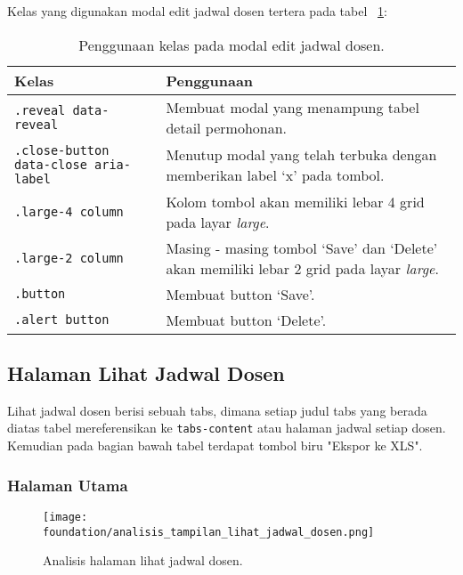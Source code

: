 Kelas yang digunakan modal edit jadwal dosen tertera pada tabel ~\ref{fig:analisisEditEntriJadwalDosen}:
\begin{table}[H]
	\centering
	\caption{Penggunaan kelas pada modal edit jadwal dosen.}
	\begin{tabularx}{\textwidth}{lX}
		\toprule
		Kelas     & Penggunaan \\
		\midrule
		\texttt{.reveal data-reveal} & Membuat modal yang menampung tabel detail permohonan.\\
		\texttt{.close-button data-close aria-label} & Menutup modal yang telah terbuka dengan memberikan label `x' pada tombol.\\
		\texttt{.large-4 column} & Kolom tombol akan memiliki lebar 4 grid pada layar \textit{large}.\\
		\texttt{.large-2 column} & Masing - masing tombol `Save' dan `Delete' akan memiliki lebar 2 grid pada layar \textit{large}.\\
		\texttt{.button} & Membuat button `Save'.\\
		\texttt{.alert button} & Membuat button `Delete'.\\
		\bottomrule
	\end{tabularx}%
	\label{fig:analisisEditEntriJadwalDosen}
\end{table}


\subsection{Halaman Lihat Jadwal Dosen}
\noindent Lihat jadwal dosen berisi sebuah tabs, dimana setiap judul tabs yang berada diatas tabel mereferensikan ke \texttt{tabs-content} atau halaman jadwal setiap dosen. Kemudian pada bagian bawah tabel terdapat tombol biru "Ekspor ke XLS".
\subsubsection{Halaman Utama}
\begin{figure} [H]
	\centering  
	\texttt{[image: foundation/analisis\_tampilan\_lihat\_jadwal\_dosen.png]}
	\caption{Analisis halaman lihat jadwal dosen.}
	\label{fig:analisisLihatJadwalDosen}
\end{figure}

